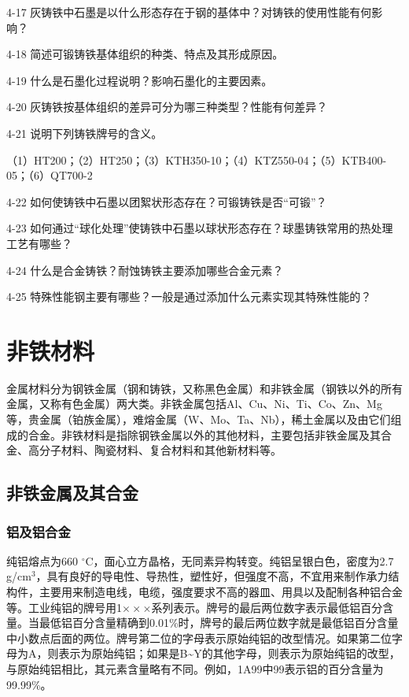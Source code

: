 \documentclass[UTF8]{ctexbook}
\newcommand{\◎}{\ensuremath{\bigcirc}}
\begin{document}
4-17 灰铸铁中石墨是以什么形态存在于钢的基体中？对铸铁的使用性能有何影响？

4-18 简述可锻铸铁基体组织的种类、特点及其形成原因。

4-19 什么是石墨化过程说明？影响石墨化的主要因素。

4-20 灰铸铁按基体组织的差异可分为哪三种类型？性能有何差异？

4-21 说明下列铸铁牌号的含义。

（1）HT200；（2）HT250；（3）KTH350-10；（4）KTZ550-04；（5）KTB400-05；（6）QT700-2

4-22 如何使铸铁中石墨以团絮状形态存在？可锻铸铁是否“可锻”？

4-23 如何通过“球化处理”使铸铁中石墨以球状形态存在？球墨铸铁常用的热处理工艺有哪些？

4-24 什么是合金铸铁？耐蚀铸铁主要添加哪些合金元素？

4-25 特殊性能钢主要有哪些？一般是通过添加什么元素实现其特殊性能的？


\chapter{非铁材料}

金属材料分为钢铁金属（钢和铸铁，又称黑色金属）和非铁金属（钢铁以外的所有金属，又称有色金属）两大类。非铁金属包括Al、Cu、Ni、Ti、Co、Zn、Mg等，贵金属（铂族金属），难熔金属（W、Mo、Ta、Nb），稀土金属以及由它们组成的合金。非铁材料是指除钢铁金属以外的其他材料，主要包括非铁金属及其合金、高分子材料、陶瓷材料、复合材料和其他新材料等。

\section{非铁金属及其合金}

\subsection{铝及铝合金}

纯铝熔点为660 $^\circ$C，面心立方晶格，无同素异构转变。纯铝呈银白色，密度为2.7 g/cm$^3$，具有良好的导电性、导热性，塑性好，但强度不高，不宜用来制作承力结构件，主要用来制造电线，电缆，强度要求不高的器皿、用具以及配制各种铝合金等。工业纯铝的牌号用1$\times\times\times$系列表示。牌号的最后两位数字表示最低铝百分含量。当最低铝百分含量精确到0.01\%时，牌号的最后两位数字就是最低铝百分含量中小数点后面的两位。牌号第二位的字母表示原始纯铝的改型情况。如果第二位字母为A，则表示为原始纯铝；如果是B\textasciitilde Y的其他字母，则表示为原始纯铝的改型，与原始纯铝相比，其元素含量略有不同。例如，1A99中99表示铝的百分含量为99.99\%。
\end{document}
